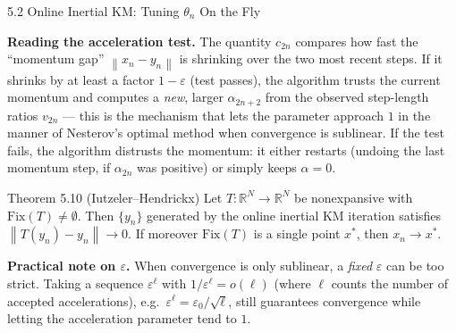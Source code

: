 \documentclass[aspectratio=169,10pt]{beamer}
\newcommand{\norm}[1]{\left\|#1\right\|}
\newcommand{\Fix}{\mathrm{Fix}}
\newcommand{\R}{\mathbb{R}}
\begin{document}
\begin{frame}[allowframebreaks]{5.2 Online Inertial KM: Tuning $\theta_n$ On the Fly}
  \framebreak

  \textbf{Reading the acceleration test.}  The quantity $c_{2n}$
  compares how fast the ``momentum gap'' $\norm{x_n-y_n}$ is
  shrinking over the two most recent steps. If it shrinks by at
  least a factor $1-\varepsilon$ (test passes), the algorithm trusts
  the current momentum and computes a \emph{new}, larger
  $\alpha_{2n+2}$ from the observed step-length ratios $v_{2n}$
  --- this is the mechanism that lets the parameter approach $1$
  in the manner of Nesterov's optimal method when convergence is
  sublinear. If the test fails, the algorithm distrusts the
  momentum: it either restarts (undoing the last momentum step,
  if $\alpha_{2n}$ was positive) or simply keeps $\alpha=0$.

  \begin{alertblock}{Theorem 5.10 (Iutzeler--Hendrickx)}
    Let $T:\R^N\to\R^N$ be nonexpansive with $\Fix(T)\neq\emptyset$.
    Then $\{y_n\}$ generated by the online inertial KM iteration
    satisfies $\norm{T(y_n)-y_n}\to0$. If moreover $\Fix(T)$ is a
    single point $x^*$, then $x_n\to x^*$.
  \end{alertblock}

  \textbf{Practical note on $\varepsilon$.} When convergence is only
  sublinear, a \emph{fixed} $\varepsilon$ can be too strict. Taking
  a sequence $\varepsilon^\ell$ with $1/\varepsilon^\ell=o(\ell)$
  (where $\ell$ counts the number of accepted accelerations), e.g.\
  $\varepsilon^\ell=\varepsilon_0/\sqrt{\ell}$, still guarantees
  convergence while letting the acceleration parameter tend to $1$.

\end{frame}
\end{document}
